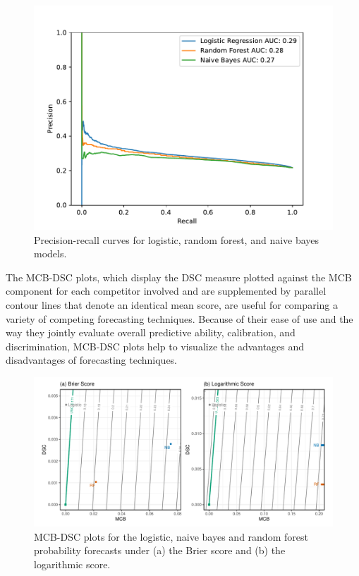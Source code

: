 \documentclass[a4paper,12pt]{article}
\numberwithin{equation}{section}
\begin{document}
 \begin{figure}[h]
   \centering
   \includegraphics[scale=0.6]{Plots_app/Precision_recall_app.pdf}
   \caption{Precision-recall curves for logistic, random forest, and naive bayes models.}
   \label{fig:Precision_recall_app}
\end{figure}
  
The MCB-DSC plots, which display the DSC measure plotted against the MCB component for each competitor involved and are supplemented by parallel contour lines that denote an identical mean score, are useful for comparing a variety of competing forecasting techniques. Because of their ease of use and the way they jointly evaluate overall predictive ability, calibration, and discrimination, MCB-DSC plots help to visualize the advantages and disadvantages of forecasting techniques. 

   \begin{figure}[hbt!]
      \centering
      \includegraphics[scale=0.5]{Plots_app/app_MCBDSC.pdf}
      \caption{MCB-DSC plots for the logistic, naive bayes and random forest probability forecasts under (a) the Brier score and (b) the logarithmic score.}
      \label{fig:app_MCBDSC}
     \end{figure}
\end{document}
